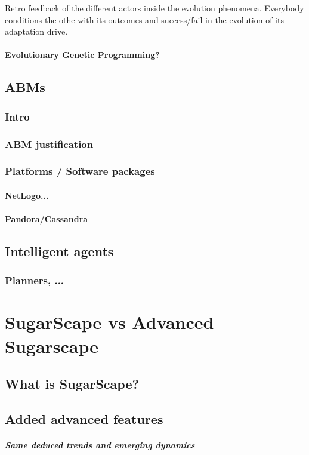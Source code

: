 \documentclass{report}
\begin{document}
Retro feedback of the different actors inside the evolution phenomena.
Everybody conditions the othe with its outcomes and success/fail in the evolution of
its adaptation drive.

			\subsubsection{Evolutionary \/ Genetic Programming?}
	\section{ABMs}
	  \subsection{Intro}
	  \subsection{ABM justification}		
	   \subsection{Platforms / Software packages}
		\subsubsection{NetLogo...}
		\subsubsection{Pandora/Cassandra}
	\section{Intelligent agents}
	  \subsection{Planners, ...}
\newpage 	
\chapter{SugarScape vs Advanced Sugarscape}
	\section{What is SugarScape?}
	\section{Added advanced features}
		\paragraph{Same deduced trends and emerging dynamics}
\end{document}
